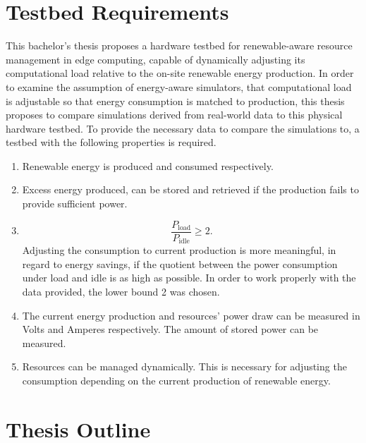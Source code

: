 \section{Testbed Requirements}

This bachelor's thesis proposes a hardware testbed for renewable-aware resource
management in edge computing, capable of dynamically adjusting its computational
load relative to the on-site renewable energy production. In order to examine
the assumption of energy-aware simulators, that computational load is adjustable
so that energy consumption is matched to production, this thesis proposes to
compare simulations derived from real-world data to this physical hardware
testbed. To provide the necessary data to compare the simulations to, a testbed
with the following properties is required.

\begin{enumerate}
    \item Renewable energy is produced and consumed respectively.
    \item Excess energy produced, can be stored and retrieved if the production
        fails to provide sufficient power.
    \item \[ \frac{P_{\text{load}}}{P_{\text{idle}}} \geq 2 .\]
        Adjusting the consumption to current production is more meaningful, in
        regard to energy savings, if the quotient between the power consumption
        under load and idle is as high as possible. In order to work properly
        with the data provided, the lower bound 2 was chosen.
    \item The current energy production and resources' power draw can be
        measured in Volts and Amperes respectively. The amount of stored power
        can be measured.
    \item Resources can be managed dynamically. This is necessary for adjusting
        the consumption depending on the current production of renewable energy.
\end{enumerate}

\section{Thesis Outline}
